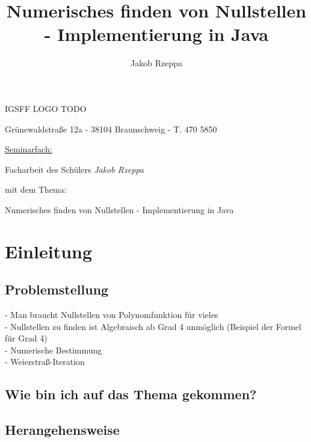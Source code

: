 \documentclass[12pt]{article}
\title{Numerisches finden von Nullstellen - Implementierung in Java}
\author{Jakob Rzeppa}
\begin{document}
\begin{titlepage}
	\centering
    {\huge IGSFF LOGO TODO\par}
	{Grünewaldstraße 12a - 38104 Braunschweig - T. 470 5850\par}
	\vspace{1cm}
	{\underline{Seminarfach:}\par}
	\vspace{1cm}
    {\large Facharbeit des Schülers \textit{Jakob Rzeppa} \par mit dem Thema: \par}
    \vspace{1.5cm}
	{\huge Numerisches finden von Nullstellen - Implementierung in Java\par}
	\vspace{2cm}
\end{titlepage}

\tableofcontents

\section{Einleitung}

\subsection{Problemstellung}
- Man braucht Nullstellen von Polynomfunktion für vieles\\
- Nullstellen zu finden ist Algebraisch ab Grad 4 unmöglich (Beispiel der Formel für Grad 4)\\
- Numerische Bestimmung\\
- Weierstraß-Iteration\\

\subsection{Wie bin ich auf das Thema gekommen?}

\subsection{Herangehensweise}
\end{document}
